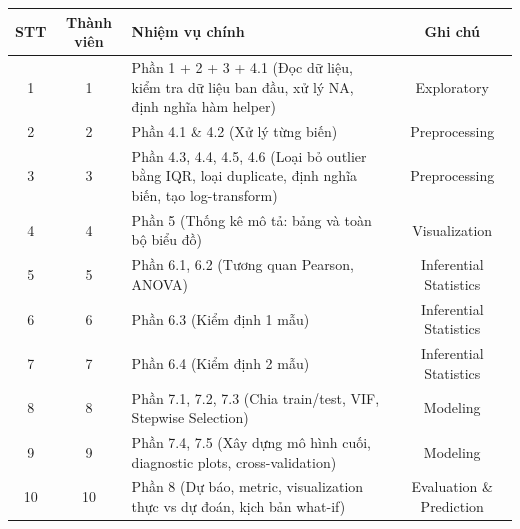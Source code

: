 \renewcommand{\arraystretch}{1.3} %

\begin{tabular}{|c|c|p{7cm}|c|}
\hline
\textbf{STT} & \textbf{Thành viên} & \textbf{Nhiệm vụ chính} & \textbf{Ghi chú} \\
\hline

1 & 1 & Phần 1 + 2 + 3 + 4.1 (Đọc dữ liệu, kiểm tra dữ liệu ban đầu, xử lý NA, định nghĩa hàm helper) & Exploratory \\
\hline

2 & 2 & Phần 4.1 \& 4.2 (Xử lý từng biến) & Preprocessing \\
\hline

3 & 3 & Phần 4.3, 4.4, 4.5, 4.6 (Loại bỏ outlier bằng IQR, loại duplicate, định nghĩa biến, tạo log-transform) & Preprocessing \\
\hline

4 & 4 & Phần 5 (Thống kê mô tả: bảng và toàn bộ biểu đồ) & Visualization \\
\hline

5 & 5 & Phần 6.1, 6.2 (Tương quan Pearson, ANOVA) & Inferential Statistics \\
\hline

6 & 6 & Phần 6.3 (Kiểm định 1 mẫu) & Inferential Statistics \\
\hline

7 & 7 & Phần 6.4 (Kiểm định 2 mẫu) & Inferential Statistics \\
\hline

8 & 8 & Phần 7.1, 7.2, 7.3 (Chia train/test, VIF, Stepwise Selection) & Modeling \\
\hline

9 & 9 & Phần 7.4, 7.5 (Xây dựng mô hình cuối, diagnostic plots, cross-validation) & Modeling \\
\hline

10 & 10 & Phần 8 (Dự báo, metric, visualization thực vs dự đoán, kịch bản what-if) & Evaluation \& Prediction \\
\hline

\end{tabular}